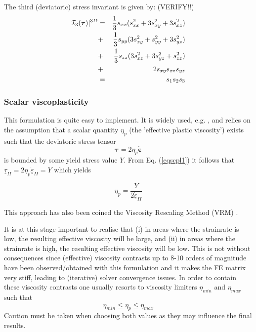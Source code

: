 The third (deviatoric) stress invariant is given by: (VERIFY!!)
\begin{eqnarray}
{\cal I}_3({\bm \tau})|^{3D} 
&=&  \frac{1}{3} s_{xx} (s_{xx}^2 + 3  s_{xy}^2   + 3  s_{xz}^2  )     \nonumber\\
&+& \frac{1}{3} s_{yy} (3s_{xy}^2 +  s_{yy}^2   + 3  s_{yz}^2  )     \nonumber\\
&+& \frac{1}{3} s_{zz} ( 3 s_{xz}^2  + 3 s_{yz}^2 +s_{zz}^2)       \nonumber\\
&+& 2   s_{xy} s_{xz} s_{yz}   \nonumber \\
&=& s_1 s_2 s_3 \nonumber
\end{eqnarray}








\subsubsection{Scalar viscoplasticity}

This formulation is quite easy to implement. It is widely used, e.g. \cite{will92,thfb08,spmw16}, and relies on the assumption that 
a scalar quantity $\eta_p$ (the 'effective plastic viscosity') exists such that the deviatoric stress tensor 
\begin{equation}
{\bm \tau}=2\eta_p \dot{\bm\varepsilon} \label{eqscpl1}
\end{equation}
is bounded by some yield stress value $Y$.
From Eq. (\ref{eqscpl1}) it follows that $\underline{\tau}_{II}= 2\eta_p \dot{\underline{\varepsilon}}_{II}=Y$ which yields
\begin{mdframed}[backgroundcolor=blue!5]
\[
\eta_p = \frac{Y}{2 \dot{\underline{\varepsilon}}_{II}}
\]
\end{mdframed}
This approach has also been coined the Viscosity Rescaling Method (VRM) \cite{kacha04}.  


It is at this stage important to realise that (i) in areas where the strainrate is low, the resulting effective viscosity will be large, and 
(ii) in areas where the strainrate is high, the resulting effective viscosity will be low. This is not without consequences since 
(effective) viscosity contrasts up to 8-10 orders of magnitude have been observed/obtained with this formulation and it makes the FE 
matrix very stiff, leading to (iterative) solver convergence issues.
In order to contain these viscosity contrasts one usually resorts to viscosity limiters $\eta_{min}$ and $\eta_{max}$ such that 
\[
\eta_{min} \leq \eta_p \leq \eta_{max}
\]
Caution must be taken when choosing both values as they may influence the final results.


